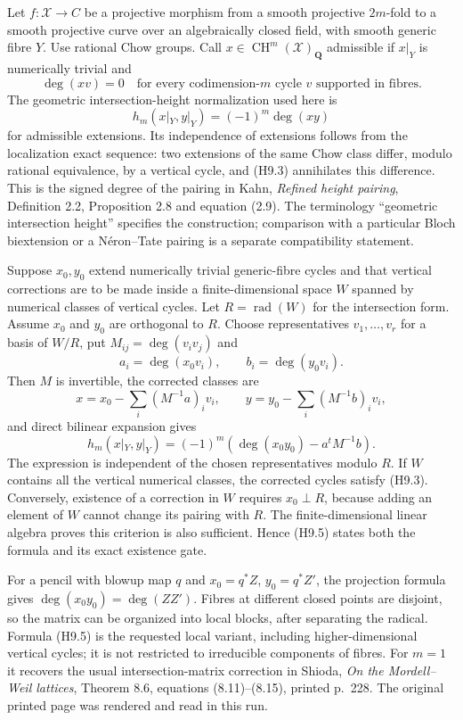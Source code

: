 Let $f:\mathcal X\to C$ be a projective morphism from a smooth projective
$2m$-fold to a smooth projective curve over an algebraically closed field,
with smooth generic fibre $Y$. Use rational Chow groups. Call
$x\in\operatorname{CH}^m(\mathcal X)_{\mathbf Q}$ admissible if
$x|_Y$ is numerically trivial and
\[
 \deg(xv)=0
 \quad\text{for every codimension-$m$ cycle $v$ supported in fibres.}
                                                        \tag{H9.3}
\]
The geometric intersection-height normalization used here is
\[
 h_m(x|_Y,y|_Y)=(-1)^m\deg(xy)                    \tag{H9.4}
\]
for admissible extensions. Its independence of extensions follows from
the localization exact sequence: two extensions of the same Chow class
differ, modulo rational equivalence, by a vertical cycle, and (H9.3)
annihilates this difference. This is the signed degree of the pairing in
Kahn, \emph{Refined height pairing}, Definition 2.2, Proposition 2.8 and
equation (2.9). The terminology ``geometric intersection height'' specifies
the construction; comparison with a particular Bloch biextension or a
N\'eron--Tate pairing is a separate compatibility statement.

Suppose $x_0,y_0$ extend numerically trivial generic-fibre cycles and that
vertical corrections are to be made inside a finite-dimensional space
$W$ spanned by numerical classes of vertical cycles. Let
$R=\operatorname{rad}(W)$ for the intersection form. Assume $x_0$ and $y_0$
are orthogonal to $R$. Choose representatives $v_1,\ldots,v_r$ for a basis
of $W/R$, put $M_{ij}=\deg(v_iv_j)$ and
\[
 a_i=\deg(x_0v_i),\qquad b_i=\deg(y_0v_i).
\]
Then $M$ is invertible, the corrected classes are
\[
 x=x_0-\sum_i(M^{-1}a)_i v_i,\qquad
 y=y_0-\sum_i(M^{-1}b)_i v_i,
\]
and direct bilinear expansion gives
\[
 h_m(x|_Y,y|_Y)=(-1)^m\left(\deg(x_0y_0)-a^{\!t}M^{-1}b\right).
                                                        \tag{H9.5}
\]
The expression is independent of the chosen representatives modulo $R$.
If $W$ contains all the vertical numerical classes, the corrected cycles
satisfy (H9.3). Conversely, existence of a correction in $W$ requires
$x_0\perp R$, because adding an element of $W$ cannot change its pairing
with $R$. The finite-dimensional linear algebra proves this criterion is
also sufficient. Hence (H9.5) states both the formula and its exact
existence gate.

For a pencil with blowup map $q$ and $x_0=q^*Z$, $y_0=q^*Z'$, the
projection formula gives $\deg(x_0y_0)=\deg(ZZ')$. Fibres at different
closed points are disjoint, so the matrix can be organized into local
blocks, after separating the radical. Formula (H9.5) is the requested
local variant, including higher-dimensional vertical cycles; it is not
restricted to irreducible components of fibres. For $m=1$ it recovers the
usual intersection-matrix correction in Shioda, \emph{On the Mordell--Weil
lattices}, Theorem 8.6, equations (8.11)--(8.15), printed p.~228. The
original printed page was rendered and read in this run.

